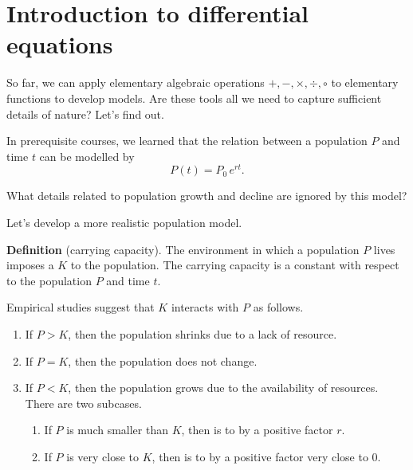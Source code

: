 \documentclass[../main.tex]{subfiles}
\begin{document}
 \section{Introduction to differential equations}

So far, we can apply elementary algebraic operations \(+, -, \times, \div, \circ\) to elementary functions to develop models. Are these tools all we need to capture sufficient details of nature? Let's find out.

\begin{example}
  In prerequisite courses, we learned that the relation between a population \(P\) and time \(t\) can be modelled by
  \begin{equation} \label{eq:exponential-growth}
    P(t) = P_{0} \, e^{rt}.
  \end{equation}

  \faComment{} What details related to population growth and decline are ignored by this model?
\end{example}

\clearpage
Let's develop a more realistic population model.

\begin{mdframed}[style=simple-compact] \label{def:carrying-capacity}
  \textbf{Definition} (carrying capacity). The environment in which a population \(P\) lives imposes a  \(K\) to the population. The carrying capacity is a constant with respect to the population \(P\) and time \(t\).  
\end{mdframed}

Empirical studies suggest that \(K\) interacts with \(P\) as follows.
\begin{enumerate}[label=(L\arabic*)]
  \item If \(P > K\), then the population shrinks due to a lack of resource.
  \item If \(P = K\), then the population does not change.
  \item If \(P < K\), then the population grows due to the availability of resources.  There are two subcases.
    \begin{enumerate}
      \item If \(P\) is much smaller than \(K\), then  is  to  by a positive factor \(r\).
      \item If \(P\) is very close to \(K\), then  is  to  by a positive factor very close to \(0\).
    \end{enumerate}
\end{enumerate}
\end{document}
